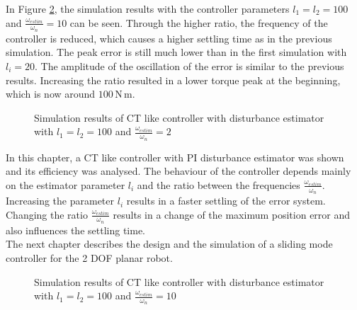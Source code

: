 In Figure \ref{fig:ch5_sim3}, the simulation results with the controller parameters $l_1 = l_2 = 100$ and $\frac{\omega_{estim}}{\omega_n} = 10$ can be seen. Through the higher ratio, the frequency of the controller is reduced, which causes a higher settling time as in the previous simulation. The peak error is still much lower than in the first simulation with $l_i = 20$. The amplitude of the oscillation of the error is similar to the previous results. Increasing the ratio resulted in a lower torque peak at the beginning, which is now around $100\,\mathrm{N\,m}$.
\begin{figure}[H]
	\centering
	
	\caption{Simulation results of CT like controller with disturbance estimator with $l_1 = l_2 = 100$ and $\frac{\omega_{estim}}{\omega_n} = 2$}
	\label{fig:ch5_sim2}
\end{figure}
In this chapter, a \ac{CT} like controller with PI disturbance estimator was shown and its efficiency was analysed. The behaviour of the controller depends mainly on the estimator parameter $l_i$ and the ratio between the frequencies $\frac{\omega_{estim}}{\omega_n}$. Increasing the parameter $l_i$ results in a faster settling of the error system. Changing the ratio $\frac{\omega_{estim}}{\omega_n}$ results in a change of the maximum position error and also influences the settling time.\\
The next chapter describes the design and the simulation of a sliding mode controller for the 2 \ac{DOF} planar robot.
\begin{figure}[H]
	\centering
	
	\caption{Simulation results of CT like controller with disturbance estimator with $l_1 = l_2 = 100$ and $\frac{\omega_{estim}}{\omega_n} = 10$}
	\label{fig:ch5_sim3}
\end{figure}